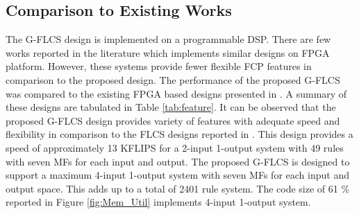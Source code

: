 \subsection{Comparison to Existing Works}
The G\hyp{}FLCS design is implemented on a programmable DSP. There are few works reported in the literature which implements similar designs on FPGA platform. However, these systems provide fewer flexible FCP features in comparison to the proposed design. The performance of the proposed G-FLCS was compared to the existing FPGA based designs presented in \cite{Millan2008,Fu2010}. A summary of these designs are tabulated in Table \ref{tab:feature}. It can be observed that the proposed G-FLCS design provides variety of features with adequate speed and flexibility in comparison to the FLCS designs reported in \cite{Millan2008,Fu2010}. This design provides a speed of approximately 13 KFLIPS for a 2\hyp{}input 1\hyp{}output system with 49 rules with seven MFs for each input and output. The proposed G\hyp{}FLCS is designed to support a maximum 4\hyp{}input 1\hyp{}output system with seven MFs for each input and output space. This adds up to a total of 2401 rule system. The code size of 61 \% reported in Figure \ref{fig:Mem_Util} implements 4-input 1-output system. 

